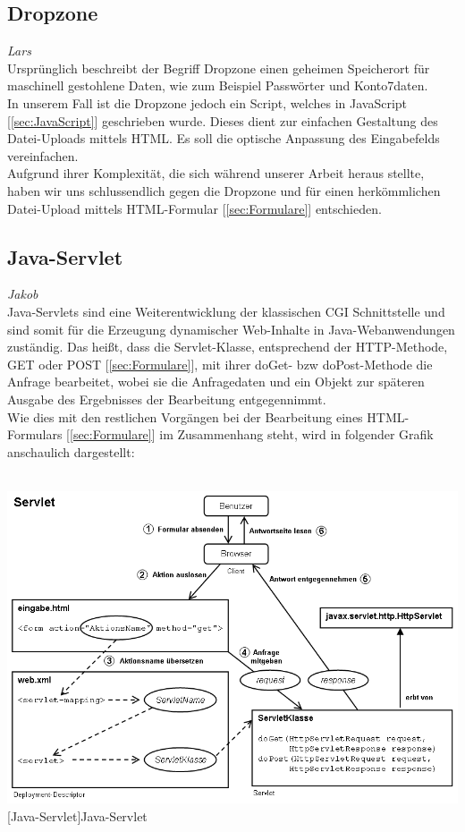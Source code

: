 \documentclass[12pt,a4paper,bibliography=totocnumbered,listof=totocnumbered]{scrartcl}
\begin{document}
\subsection{Dropzone}
\label{sec:Dropzone}
\emph{Lars}\\
Ursprünglich beschreibt der Begriff \glqq Dropzone\grqq{} einen geheimen Speicherort für maschinell gestohlene Daten, wie zum Beispiel Passwörter und Konto7daten.\cite{wiki/Dropzone} \\
In unserem Fall ist die Dropzone jedoch ein Script, welches in JavaScript [\ref{sec:JavaScript}] geschrieben wurde. Dieses dient zur einfachen Gestaltung des Datei-Uploads mittels HTML. Es soll die optische Anpassung des Eingabefelds vereinfachen. \\
Aufgrund ihrer Komplexität, die sich während unserer Arbeit heraus stellte, haben wir uns schlussendlich gegen die Dropzone und für einen herkömmlichen Datei-Upload mittels HTML-Formular [\ref{sec:Formulare}] entschieden.


\subsection{Java-Servlet}
\label{sec:Java-Servlet}
\emph{Jakob}\\
Java-Servlets sind eine Weiterentwicklung der klassischen CGI Schnittstelle und sind somit für die Erzeugung dynamischer Web-Inhalte in Java-Webanwendungen zuständig.
Das heißt, dass die Servlet-Klasse, entsprechend der HTTP-Methode, GET oder POST [\ref{sec:Formulare}], mit ihrer doGet- bzw doPost-Methode die Anfrage bearbeitet, wobei sie die Anfragedaten und ein Objekt zur späteren Ausgabe des Ergebnisses der Bearbeitung entgegennimmt.\cite{wiki/Servlet}\\
Wie dies mit den restlichen Vorgängen bei der Bearbeitung eines HTML-Formulars [\ref{sec:Formulare}] im Zusammenhang steht, wird in folgender Grafik anschaulich dargestellt:\\
\\
\vspace{1em}
\begin{minipage}{\linewidth}
	\centering
	\includegraphics[width=0.9\linewidth]{Bilder/600px-Servlet.png}
	[Java-Servlet]{Java-Servlet\footnotemark }
	\label{fig:servlet}
\end{minipage}
\end{document}

